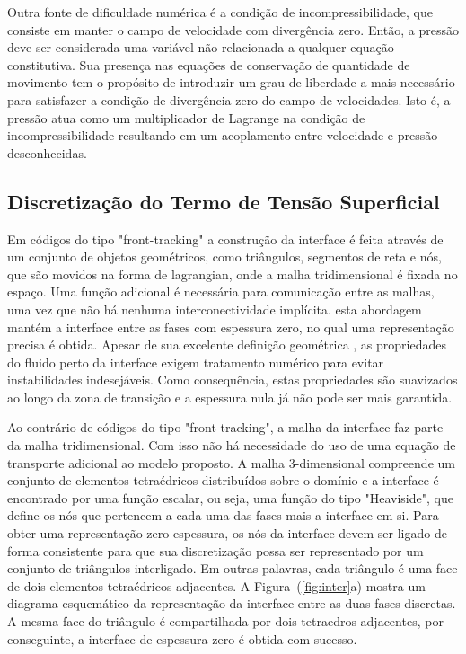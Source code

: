 \documentclass[a4paper,portuges,12pt]{article}
\begin{document}
Outra fonte de dificuldade numérica é a condição de incompressibilidade,
que consiste em manter o campo de velocidade com divergência zero.
Então, a pressão deve ser considerada uma variável não relacionada a
qualquer equação constitutiva.  Sua presença nas equações de conservação
de quantidade de movimento tem o propósito de introduzir um grau de
liberdade a mais necessário para satisfazer a condição de divergência
zero do campo de velocidades.  Isto é, a pressão atua como um
multiplicador de Lagrange na condição de incompressibilidade resultando
em um acoplamento entre velocidade e pressão desconhecidas.

\subsection{Discretização do Termo de Tensão Superficial}

Em códigos do tipo "front-tracking" a construção da interface é feita
através de um conjunto de objetos geométricos, como triângulos,
segmentos de reta e nós, que são movidos na forma de lagrangian, onde a
malha tridimensional é fixada no espaço. Uma função adicional é necessária
para comunicação entre as malhas, uma vez que não há nenhuma
interconectividade implícita. esta abordagem mantém a interface entre as
fases com espessura zero, no qual uma representação precisa é obtida.
Apesar de sua excelente definição geométrica , as propriedades do fluido
perto da interface exigem tratamento numérico para evitar instabilidades
indesejáveis. Como consequência, estas propriedades são suavizados ao
longo da zona de transição e a espessura nula já não pode ser mais
garantida.

Ao contrário de códigos do tipo "front-tracking", a malha da interface
faz parte da malha tridimensional. Com isso não há necessidade do uso de
uma equação de transporte adicional ao modelo proposto. A malha
3-dimensional compreende um conjunto de elementos tetraédricos
distribuídos sobre o domínio e a interface é encontrado por uma função
escalar, ou seja, uma função do tipo "Heaviside", que define os nós que
pertencem a cada uma das fases mais a interface em si. Para obter uma
representação zero espessura, os nós da interface devem ser ligado de
forma consistente para que sua discretização possa ser representado por
um conjunto de triângulos interligado. Em outras palavras, cada
triângulo é uma face de dois elementos tetraédricos adjacentes. A
Figura~(\ref{fig:inter}a) mostra um diagrama esquemático da
representação da interface entre as duas fases discretas. A mesma face
do triângulo é compartilhada por dois tetraedros adjacentes, por
conseguinte, a interface de espessura zero é obtida com sucesso.
\end{document}
